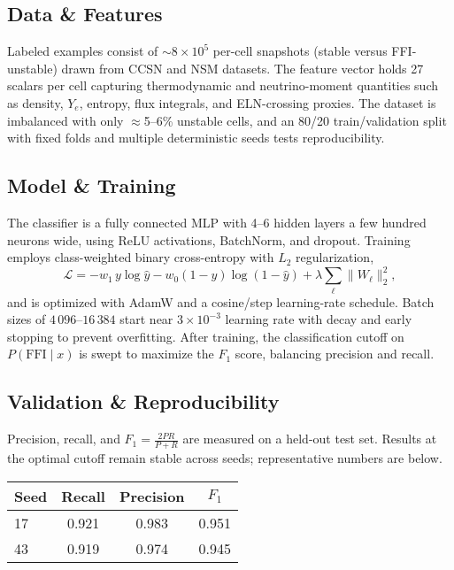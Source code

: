 \documentclass[10pt]{article}
\begin{document}
\begin{center}
\subsection*{Data \& Features}
Labeled examples consist of $\sim 8\times 10^5$ per-cell snapshots (stable versus FFI-unstable) drawn from CCSN and NSM datasets.
The feature vector holds 27 scalars per cell capturing thermodynamic and neutrino-moment quantities such as density, $Y_e$, entropy, flux integrals, and ELN-crossing proxies.
The dataset is imbalanced with only $\approx$5--6\% unstable cells, and an 80/20 train/validation split with fixed folds and multiple deterministic seeds tests reproducibility.

\subsection*{Model \& Training}
The classifier is a fully connected MLP with 4--6 hidden layers a few hundred neurons wide, using ReLU activations, BatchNorm, and dropout.
Training employs class-weighted binary cross-entropy with $L_2$ regularization,
\begin{equation*}
\mathcal{L} = -w_1\, y\log \hat y - w_0 (1-y)\log(1-\hat y) + \lambda \sum_{\ell}\lVert W_\ell\rVert_2^2,
\end{equation*}
and is optimized with AdamW and a cosine/step learning-rate schedule.
Batch sizes of $4\,096$--$16\,384$ start near $3\times 10^{-3}$ learning rate with decay and early stopping to prevent overfitting.
After training, the classification cutoff on $P(\mathrm{FFI}\mid x)$ is swept to maximize the $F_1$ score, balancing precision and recall.

\subsection*{Validation \& Reproducibility}
Precision, recall, and $F_1 = \frac{2PR}{P+R}$ are measured on a held-out test set.
Results at the optimal cutoff remain stable across seeds; representative numbers are below.

\begin{center}
\begin{tabular}{@{}lccc@{}}
\toprule
Seed & Recall & Precision & $F_1$ \\\midrule
17 & 0.921 & 0.983 & 0.951 \\
43 & 0.919 & 0.974 & 0.945 \\
\bottomrule
\end{tabular}
\end{center}


\end{center}
\end{document}
